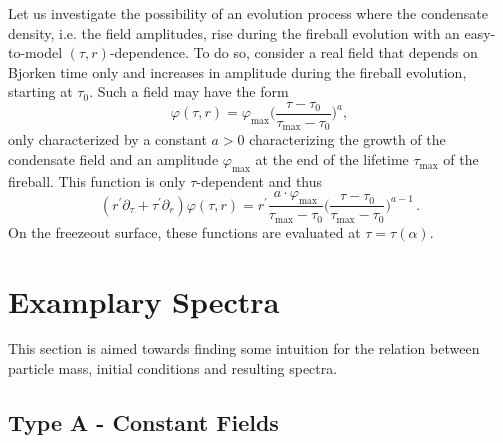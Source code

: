Let us investigate the possibility of an evolution process where the condensate density, i.e. the field amplitudes, rise during the fireball evolution with an easy-to-model ${(\tau,r)}$-dependence. To do so, consider a real field that depends on Bjorken time only and increases in amplitude during the fireball evolution, starting at $\tau_0$.  Such a field may have the form 
\begin{equation}
    \varphi(\tau,r)=\varphi_{\text{max}}\Big(\frac{\tau-\tau_0}{\tau_{\text{max}}-\tau_0}\Big)^a,
    \label{eq:TauDepFields}
\end{equation}
only characterized by a constant $a>0$ characterizing the growth of the condensate field and an amplitude $\varphi_{\text{max}}$ at the end of the lifetime $\tau_{\text{max}}$ of the fireball. This function is only $\tau$-dependent and thus
\begin{equation}
    (r^\prime\partial_\tau+\tau^\prime\partial_r)\varphi(\tau,r)=r^\prime\frac{a\cdot\varphi_{\text{max}}}{\tau_{\text{max}}-\tau_0}\Big(\frac{\tau-\tau_0}{\tau_{\text{max}}-\tau_0}\Big)^{a-1} \,.
\end{equation}
On the freezeout surface, these functions are evaluated at ${\tau=\tau(\alpha)}$.

\section{Examplary Spectra}
\label{sec:ExampleSpectra}

This section is aimed towards finding some intuition for the relation between particle mass, initial conditions and resulting spectra.

\subsection{Type A - Constant Fields}

